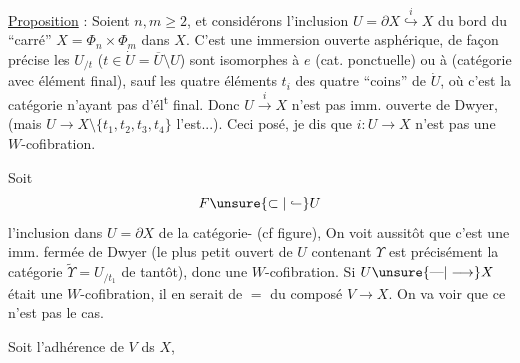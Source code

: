 
\uline{Proposition} : Soient $n,m\geq 2$, et considérons l’inclusion $U=\partial X\overset{i}{\hookrightarrow}X$ du bord du ``carré'' $X=\Phi_n\times\Phi_m$ dans $X$. C’est une immersion ouverte asphérique, de façon précise les $U_{/t}$ ($t\in\dot U=\overline U\setminus U$) sont isomorphes à $e$ (cat. ponctuelle) ou à
\diagram{\begin{tikzcd}[ampersand replacement=\&,row sep=tiny,column sep=small]
{} \& {} \& {}\arrow[dl]\\
\unsure{\Phi|\Psi}={} \& {}\\
{} \& {} \& {}\arrow[ul]
\end{tikzcd}}
(catégorie avec élément final), sauf  les quatre éléments $t_i$ des quatre ``coins'' de $\dot U$, où c’est la catégorie
n’ayant  pas d’él\textsuperscript{t} final. Donc $U\xrightarrow{i}X$ n’est pas imm. ouverte de Dwyer, (mais $U\longrightarrow X\setminus\{t_1,t_2,t_3,t_4\}$ l’est...). Ceci posé, je dis que $i:U\longrightarrow X$ n’est pas une $W$-cofibration.

\uline{} Soit
\[
F\unsure{\subset|\lhook\joinrel\relbar}U
\]
l’inclusion dans $U=\partial X$ de la catégorie-
(cf figure),  \unsure{(}On voit aussitôt que c’est une imm. fermée de Dwyer (le plus petit ouvert de $U$ contenant $\Upsilon$ est précisément la catégorie $\widetilde\Upsilon=U_{/t_1}$ de tantôt), donc une $W$-cofibration. Si $U\unsure{\text{---}|\longrightarrow}X$ était une $W$-cofibration, il en serait de $=$ du composé $V\longrightarrow X$. On va voir que ce n’est pas le cas.

Soit
l’adhérence de $V$ ds $X$,

